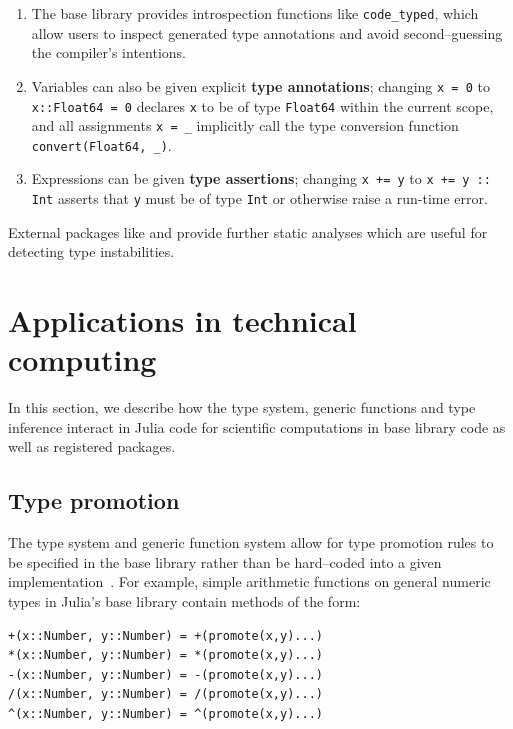 \documentclass[pldi]{sigplanconf-pldi15}
\begin{document}
\begin{enumerate}

	\item The base library provides introspection functions like
	\verb|code_typed|, which allow users to inspect generated type
	annotations and avoid second--guessing the compiler's intentions.
		
	\item Variables can also be given explicit \textbf{type annotations};
	changing \verb|x = 0| to \verb|x::Float64 = 0| declares \verb|x| to be
	of type \verb|Float64| within the current scope, and all assignments
	\verb|x = _| implicitly call the type conversion function
	\verb|convert(Float64, _)|.

	\item Expressions can be given \textbf{type assertions}; changing
	\verb|x += y| to \verb|x += y :: Int| asserts that \verb|y| must be of
	type \verb|Int| or otherwise raise a run-time error.

\end{enumerate}
%
External packages like  and  provide
further static analyses which are useful for detecting type instabilities.



\section{Applications in technical computing}

In this section, we describe how the type system, generic functions and type
inference interact in Julia code for scientific computations in base library
code as well as registered packages. 

\subsection{Type promotion}

The type system and generic function system allow for type promotion rules to
be specified in the base library rather than be hard--coded into a given
implementation~\cite{Bezanson2012a}. For example, simple arithmetic functions
on general numeric types in Julia's base library contain methods of the form:

\begin{lstlisting}
+(x::Number, y::Number) = +(promote(x,y)...)
*(x::Number, y::Number) = *(promote(x,y)...)
-(x::Number, y::Number) = -(promote(x,y)...)
/(x::Number, y::Number) = /(promote(x,y)...)
^(x::Number, y::Number) = ^(promote(x,y)...)
\end{lstlisting}
\end{document}

